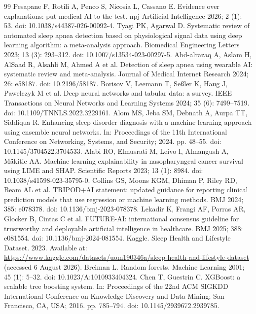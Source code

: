 \documentclass[a4paper,fleqn]{cas-dc}
\begin{document}
\begin{thebibliography}{99}
 Pesapane F, Rotili A, Penco S, Nicosia L, Cassano E. Evidence over explanations: put medical AI to the test. npj Artificial Intelligence 2026; 2 (1): 53. doi: 10.1038/s44387-026-00092-4.
 Tyagi PK, Agarwal D. Systematic review of automated sleep apnea detection based on physiological signal data using deep learning algorithm: a meta-analysis approach. Biomedical Engineering Letters 2023; 13 (3): 293--312. doi: 10.1007/s13534-023-00297-5.
 Abd-alrazaq A, Aslam H, AlSaad R, Alsahli M, Ahmed A et al. Detection of sleep apnea using wearable AI: systematic review and meta-analysis. Journal of Medical Internet Research 2024; 26: e58187. doi: 10.2196/58187.
 Borisov V, Leemann T, Se{\ss}ler K, Haug J, Pawelczyk M et al. Deep neural networks and tabular data: a survey. IEEE Transactions on Neural Networks and Learning Systems 2024; 35 (6): 7499--7519. doi: 10.1109/\allowbreak TNNLS.2022.3229161.
 Alom MS, Jeba SM, Debnath A, Aurpa TT, Siddiqua R. Enhancing sleep disorder diagnosis with a machine learning approach using ensemble neural networks. In: Proceedings of the 11th International Conference on Networking, Systems, and Security; 2024. pp. 48--55. doi: 10.1145/3704522.3704533.
 Alabi RO, Elmusrati M, Leivo I, Almangush A, M{\"a}kitie AA. Machine learning explainability in nasopharyngeal cancer survival using LIME and SHAP. Scientific Reports 2023; 13 (1): 8984. doi: 10.1038/s41598-023-35795-0.
 Collins GS, Moons KGM, Dhiman P, Riley RD, Beam AL et al. TRIPOD+AI statement: updated guidance for reporting clinical prediction models that use regression or machine learning methods. BMJ 2024; 385: e078378. doi: 10.1136/bmj-2023-078378.
 Lekadir K, Frangi AF, Porras AR, Glocker B, Cintas C et al. FUTURE-AI: international consensus guideline for trustworthy and deployable artificial intelligence in healthcare. BMJ 2025; 388: e081554. doi: 10.1136/bmj-2024-081554.
 Kaggle. Sleep Health and Lifestyle Dataset. 2023. Available at: \url{https://www.kaggle.com/datasets/uom190346a/sleep-health-and-lifestyle-dataset} (accessed 6 August 2026).
 Breiman L. Random forests. Machine Learning 2001; 45 (1): 5--32. doi: 10.1023/A:1010933404324.
 Chen T, Guestrin C. XGBoost: a scalable tree boosting system. In: Proceedings of the 22nd ACM SIGKDD International Conference on Knowledge Discovery and Data Mining; San Francisco, CA, USA; 2016. pp. 785--794. doi: 10.1145/2939672.2939785.

\end{thebibliography}
\end{document}
